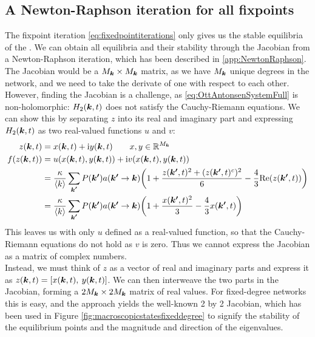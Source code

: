 \subsection{A Newton-Raphson iteration for all fixpoints}
The fixpoint iteration \eqref{eq:fixedpointiterations} only gives us the stable equilibria of the \MFR. We can obtain all equilibria and their stability through the Jacobian from a Newton-Raphson iteration, which has been described in \ref{app:NewtonRaphson}. The Jacobian would be a $M_{{\boldsymbol{k}}} \times M_{{\boldsymbol{k}}}$ matrix, as we have $M_{{\boldsymbol{k}}}$ unique degrees in the network, and we need to take the derivate of one with respect to each other. However, finding the Jacobian is a challenge, as \eqref{eq:OttAntonsenSystemFull} is non-holomorphic: $H_2({\boldsymbol{k}},t)$ does not satisfy the Cauchy-Riemann equations. We can show this by separating $z$ into its real and imaginary part and expressing $H_2({\boldsymbol{k}},t)$ as two real-valued functions $u$ and $v$:
\begin{align*}
z(\k,t) &= x(\k,t) + \ic y(\k,t) \qquad x, y \in \R^{M_{\k}}\\
f\left( z(\k,t) \right) &= u\left(x(\k, t), y(\k, t) \right) + \ic v\left(x(\k, t), y(\k, t) \right)\\
&= \frac{\kappa}{\kmean} \sum_{\kacc} P\left(\kacc\right) a\left(\kacc \rightarrow \k\right) \left( 1 + \frac{z(\kacc, t)^2 + (z(\kacc, t)^c )^2}{6} - \frac{4}{3} \Re(z(\kacc, t)) \right)\\
&= \frac{\kappa}{\kmean} \sum_{\kacc} P\left(\kacc\right) a\left(\kacc \rightarrow \k\right) \left( 1 + \frac{x(\kacc, t)^2}{3} - \frac{4}{3} x(\kacc, t) \right)
\end{align*}
This leaves us with only $u$ defined as a real-valued function, so that the Cauchy-Riemann equations do not hold as $v$ is zero. Thus we cannot express the Jacobian as a matrix of complex numbers. \\

Instead, we must think of $z$ as a vector of real and imaginary parts and express it as $z({\boldsymbol{k}},t) = [ x({\boldsymbol{k}},t), \: y({\boldsymbol{k}},t)]$. We can then interweave the two parts in the Jacobian, forming a $2 M_{{\boldsymbol{k}}} \times 2 M_{{\boldsymbol{k}}}$ matrix of real values. For fixed-degree networks this is easy, and the approach yields the well-known 2 by 2 Jacobian, which has been used in Figure \ref{fig:macroscopicstatesfixeddegree} to signify the stability of the equilibrium points and the magnitude and direction of the eigenvalues.

